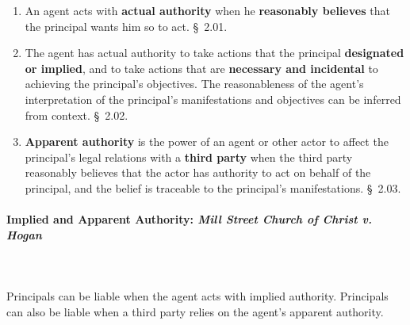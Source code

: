 \begin{enumerate}
    \item An agent acts with \textbf{actual authority} when he 
    \textbf{reasonably believes} that the principal wants him so to act. \S\ 
    2.01.
    \item The agent has actual authority to take actions that the principal 
    \textbf{designated or implied}, and to take actions that are 
    \textbf{necessary and incidental} to achieving the principal's objectives. 
    The reasonableness of the agent's interpretation of the principal's 
    manifestations and objectives can be inferred from context. \S\ 2.02.
    \item \textbf{Apparent authority} is the power of an agent or other actor 
    to affect the principal's legal relations with a \textbf{third party} when 
    the third party reasonably believes that the actor has authority to act on 
    behalf of the principal, and the belief is traceable to the principal's 
    manifestations. \S\ 2.03.
\end{enumerate}

\paragraph{Implied and Apparent Authority: \emph{Mill Street Church of Christ 
v. Hogan}}
~\\\\
Principals can be liable when the agent acts with implied authority. 
Principals can also be liable when a third party relies on the agent's 
apparent authority.

